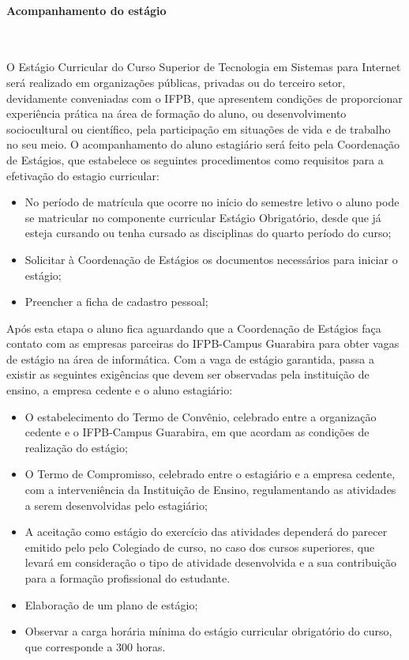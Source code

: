 \paragraph{Acompanhamento do estágio}\

       	O Estágio Curricular do Curso Superior de Tecnologia em Sistemas para Internet será realizado em organizações públicas, privadas ou do terceiro setor, devidamente conveniadas com o IFPB, que apresentem condições de proporcionar experiência prática na área de formação do aluno, ou desenvolvimento sociocultural ou científico, pela participação em situações de vida e de trabalho no seu meio. O acompanhamento do aluno estagiário será feito pela Coordenação de Estágios, que estabelece os seguintes procedimentos como requisitos para a efetivação do estagio curricular: 
\begin{itemize}
	\item No período de matrícula que ocorre no início do semestre letivo o aluno pode se matricular no componente curricular Estágio Obrigatório, desde que já esteja cursando ou tenha cursado as disciplinas do quarto período do curso;
	
	\item Solicitar à Coordenação de Estágios os documentos necessários para iniciar o estágio;

	\item Preencher a ficha de cadastro pessoal;
\end{itemize}

	Após esta etapa o aluno fica aguardando que a Coordenação de Estágios faça contato com as empresas parceiras do IFPB-Campus Guarabira para obter vagas de estágio na área de informática. Com a vaga de estágio garantida, passa a existir as seguintes exigências que devem ser observadas pela instituição de ensino, a empresa cedente e o aluno estagiário: 
	
\begin{itemize}
	\item O estabelecimento do Termo de Convênio, celebrado entre a organização cedente e o IFPB-Campus Guarabira, em que acordam as condições de realização do estágio;
	\item O Termo de Compromisso, celebrado entre o estagiário e a empresa cedente, com a interveniência da Instituição de Ensino, regulamentando as atividades a serem desenvolvidas pelo estagiário;
	\item A aceitação como estágio do exercício das atividades dependerá do parecer emitido pelo pelo Colegiado de curso, no caso dos cursos superiores, que levará em consideração o tipo de atividade desenvolvida e a sua contribuição para a formação profissional do estudante.
	\item Elaboração de um plano de estágio;
	\item Observar a carga horária mínima do estágio curricular obrigatório do curso, que corresponde a 300 horas.
\end {itemize}

